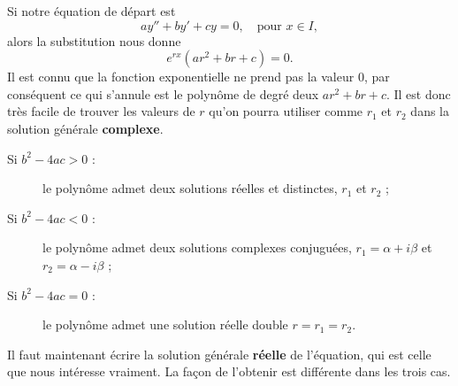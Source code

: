 Si notre équation de départ est
\begin{equation}\label{eq_lin_ordre_deux_hom}
	ay'' + by' + cy = 0, \quad\text{pour } x\in I,
\end{equation}
alors la substitution nous donne
\[
	e^{rx}\left(ar^2+br+c\right)=0.
\]
Il est connu que la fonction exponentielle ne prend pas la valeur \( 0\), par conséquent ce qui s'annule est le polynôme de degré deux \( ar^2+br+c\). Il est donc très facile de trouver les valeurs de \( r\) qu'on pourra utiliser comme \( r_1\) et \( r_2\) dans la solution générale \textbf{complexe}.
\begin{description}
	\item[Si \( b^2 - 4ac >0\) :] le polynôme admet deux solutions réelles et distinctes, \( r_1\) et \( r_2\) ;
	\item[Si \( b^2 - 4ac <0\) :] le polynôme admet deux solutions complexes conjuguées, \( r_1 = \alpha + i \beta\) et \( r_2 = \alpha - i \beta\) ;
	\item[Si \( b^2 - 4ac =0\) :] le polynôme admet une solution réelle double \( r=r_1 = r_2\).
\end{description}
Il faut maintenant écrire la solution générale \textbf{réelle} de l'équation, qui est celle que nous intéresse vraiment. La façon de l'obtenir est différente dans les trois cas.

